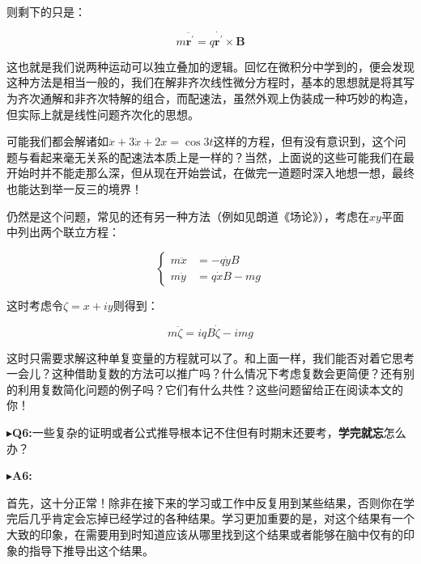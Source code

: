 \documentclass{ctexart}
\begin{document}
\begin{myexample}
\begin{enumerate}[leftmargin=*, labelsep=0.5em]
    则剩下的只是：
    
    \begin{equation*}
    m\ddot{\mathbf{r}^{\mathbf{'}}} = q\dot{\mathbf{r}^{\mathbf{'}}} \times \mathbf{B}
    \end{equation*}
    
    这也就是我们说两种运动可以独立叠加的逻辑。回忆在微积分中学到的，便会发现这种方法是相当一般的，我们在解非齐次线性微分方程时，基本的思想就是将其写为齐次通解和非齐次特解的组合，而配速法，虽然外观上伪装成一种巧妙的构造，但实际上就是线性问题齐次化的思想。
    
    可能我们都会解诸如$\ddot{x} + 3\dot{x} + 2x = \cos{3t}$这样的方程，但有没有意识到，这个问题与看起来毫无关系的配速法本质上是一样的？当然，上面说的这些可能我们在最开始时并不能走那么深，但从现在开始尝试，在做完一道题时深入地想一想，最终也能达到举一反三的境界！
  \end{enumerate}
    
  仍然是这个问题，常见的还有另一种方法（例如见朗道《场论》），考虑在$xy$平面中列出两个联立方程：
  
  \begin{equation*}
    \left\{
  \begin{aligned}
  m\ddot{x} &= -q\dot{y}B \\
  m\ddot{y} &= q\dot{x}B - mg
  \end{aligned}\right.
  \end{equation*}
  
  这时考虑令$\zeta = x + iy$则得到：
  
  \begin{equation*}
  m\ddot{\zeta} = iqB\dot{\zeta} - img
  \end{equation*}
  
  这时只需要求解这种单复变量的方程就可以了。和上面一样，我们能否对着它思考一会儿？这种借助复数的方法可以推广吗？什么情况下考虑复数会更简便？还有别的利用复数简化问题的例子吗？它们有什么共性？这些问题留给正在阅读本文的你！
\end{myexample}
  
\noindent$\blacktriangleright$\;\textbf{Q6:}一些复杂的证明或者公式推导根本记不住但有时期末还要考，\textbf{学完就忘}怎么办？
  
\noindent$\blacktriangleright$\;\textbf{A6:}

首先，这十分正常！除非在接下来的学习或工作中反复用到某些结果，否则你在学完后几乎肯定会忘掉已经学过的各种结果。学习更加重要的是，对这个结果有一个大致的印象，在需要用到时知道应该从哪里找到这个结果或者能够在脑中仅有的印象的指导下推导出这个结果。
\end{document}
